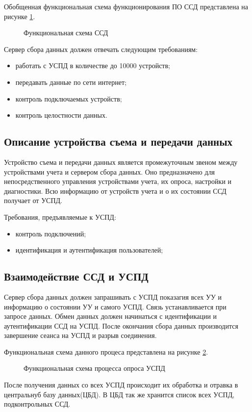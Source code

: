 Обобщенная функциональная схема функционирования ПО ССД представлена на рисунке \ref{fs_ssd:fs_ssd}.

\begin{figure}[h!]
 \caption{Функциональная схема ССД}
 \label{fs_ssd:fs_ssd}
\end{figure}

Сервер сбора данных должен отвечать следующим требованиям:

\begin{itemize}
 \item работать с УСПД в количестве до 10000 устройств;
 \item передавать данные по сети интернет;
 \item контроль подключаемых устройств;
 \item контроль целостности данных.
\end{itemize}

\subsection{Описание устройства съема и передачи данных}%

Устройство съема и передачи данных является промежуточным звеном между устройствами учета и сервером сбора данных. Оно предназначено для непосредственного управления устройствами учета, их опроса, настройки и диагностики. Всю информацию от устройств учета и о их состоянии ССД получает от УСПД.

Требования, предъявляемые к УСПД:

\begin{itemize}
 \item контроль подключений;
 \item идентификация и аутентификация пользователей;
\end{itemize}

\subsection{Взаимодействие ССД и УСПД}

Сервер сбора данных должен запрашивать с УСПД показагия всех УУ и информацию о состоянии УУ и самого УСПД. Связь устанавливается при запросе данных. Обмен данных должен начинаться с идентификации и аутентификации ССД на УСПД. После окончания сбора данных производится завершение сеанса на УСПД и разрыв соединения.

Функциональная схема данного процеса представлена на рисунке \ref{img:main_idef0}.

\begin{figure}[!Ht]
 \caption{Функциональная схема процесса опроса УСПД}
 \label{img:main_idef0}
\end{figure}

После получения данных со всех УСПД происходит их обработка и отравка в центральнуб базу данных(ЦБД). В ЦБД так же хранится список всех УСПД, подконтрольных ССД.